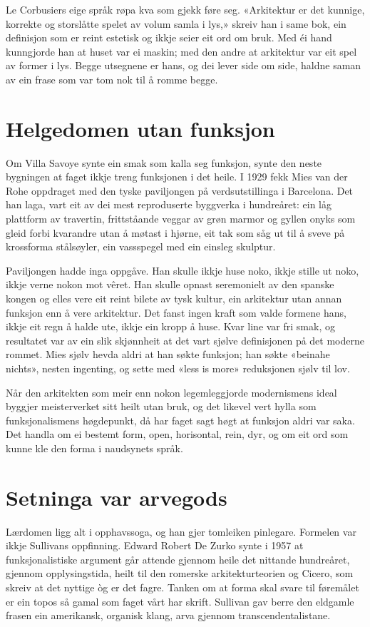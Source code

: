 Le Corbusiers eige språk røpa kva som gjekk føre seg. «Arkitektur er det kunnige, korrekte og storslåtte spelet av volum samla i lys,» skreiv han i same bok, ein definisjon som er reint estetisk og ikkje seier eit ord om bruk. Med éi hand kunngjorde han at huset var ei maskin; med den andre at arkitektur var eit spel av former i lys. Begge utsegnene er hans, og dei lever side om side, haldne saman av ein frase som var tom nok til å romme begge.

\section{Helgedomen utan funksjon}

Om Villa Savoye synte ein smak som kalla seg funksjon, synte den neste bygningen at faget ikkje treng funksjonen i det heile. I 1929 fekk Mies van der Rohe oppdraget med den tyske paviljongen på verdsutstillinga i Barcelona. Det han laga, vart eit av dei mest reproduserte byggverka i hundreåret: ein låg plattform av travertin, frittståande veggar av grøn marmor og gyllen onyks som gleid forbi kvarandre utan å møtast i hjørne, eit tak som såg ut til å sveve på krossforma stålsøyler, ein vassspegel med ein einsleg skulptur.

Paviljongen hadde inga oppgåve. Han skulle ikkje huse noko, ikkje stille ut noko, ikkje verne nokon mot vêret. Han skulle opnast seremonielt av den spanske kongen og elles vere eit reint bilete av tysk kultur, ein arkitektur utan annan funksjon enn å vere arkitektur. Det fanst ingen kraft som valde formene hans, ikkje eit regn å halde ute, ikkje ein kropp å huse. Kvar line var fri smak, og resultatet var av ein slik skjønnheit at det vart sjølve definisjonen på det moderne rommet. Mies sjølv hevda aldri at han søkte funksjon; han søkte «beinahe nichts», nesten ingenting, og sette med «less is more» reduksjonen sjølv til lov.

Når den arkitekten som meir enn nokon legemleggjorde modernismens ideal byggjer meisterverket sitt heilt utan bruk, og det likevel vert hylla som funksjonalismens høgdepunkt, då har faget sagt høgt at funksjon aldri var saka. Det handla om ei bestemt form, open, horisontal, rein, dyr, og om eit ord som kunne kle den forma i naudsynets språk.

\section{Setninga var arvegods}

Lærdomen ligg alt i opphavssoga, og han gjer tomleiken pinlegare. Formelen var ikkje Sullivans oppfinning. Edward Robert De Zurko synte i 1957 at funksjonalistiske argument går attende gjennom heile det nittande hundreåret, gjennom opplysingstida, heilt til den romerske arkitekturteorien og Cicero, som skreiv at det nyttige òg er det fagre\autocite{dezurko1957origins}. Tanken om at forma skal svare til føremålet er ein topos så gamal som faget vårt har skrift. Sullivan gav berre den eldgamle frasen ein amerikansk, organisk klang, arva gjennom transcendentalistane.

